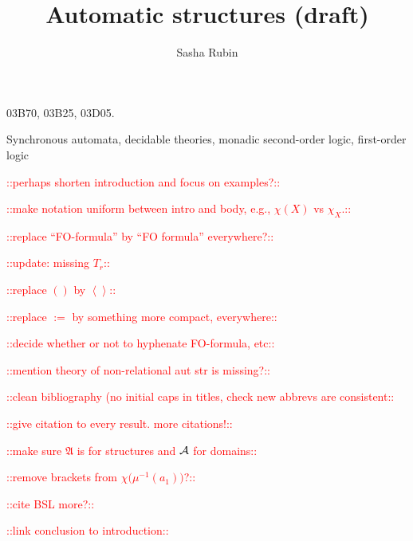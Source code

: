 \documentclass{irmaart}
\newcommand\dateandtime{\today}
\newcommand{\frakA}{\mathfrak{A}}
\newcommand\todo[1]{\textcolor{red}{::#1::}}
\begin{document}
\title{Automatic structures (draft)}
\author{Sasha Rubin}
\address{email:\,\url{rubin@unina.it}\\[4mm]
\upshape{\dateandtime}}

\maketitle\label{chapterAS} 

\begin{classification}
03B70, 03B25, 03D05.
\end{classification}

\begin{keywords}
  Synchronous automata, decidable theories, monadic second-order logic, first-order logic
\end{keywords}


\todo{perhaps shorten introduction and focus on examples?}

\todo{make notation uniform between intro and body, e.g., $\chi(X)$ vs $\chi_X$.}

\todo{replace ``FO-formula'' by ``FO formula'' everywhere?}

\todo{update: missing $T_r$}

\todo{replace $()$ by $\left< \right>$}

\todo{replace $:=$ by something more compact, everywhere}

\todo{decide whether or not to hyphenate FO-formula, etc}

\todo{mention theory of non-relational aut str is missing?}

\todo{clean bibliography (no initial caps in titles, check new abbrevs are consistent}

\todo{give citation to every result. more citations!}

\todo{make sure $\frakA$ is for structures and ${\mathcal A}$ for domains}

\todo{remove brackets from $\chi({\mu^{-1}(a_1))}$?}

\todo{cite BSL more?}

\todo{link conclusion to introduction}



\localtableofcontents






\begin{footnotesize}
  
\end{footnotesize}


\printindex
\end{document}
